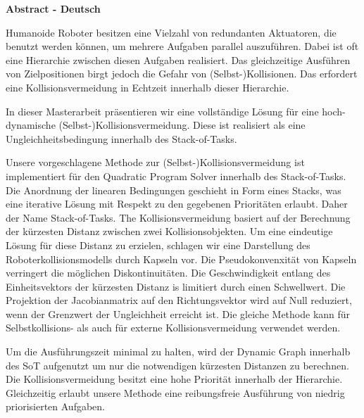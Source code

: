 

\clearemptydoublepage
{}
{}	

\vspace*{1cm}
\begin{center}
{\Large \bf Abstract - Deutsch}
\end{center}
\vspace{1cm}

Humanoide Roboter besitzen eine Vielzahl von redundanten Aktuatoren, die benutzt werden k{\"o}nnen, um mehrere Aufgaben parallel auszuf{\"u}hren. Dabei ist oft eine Hierarchie zwischen diesen Aufgaben realisiert. Das gleichzeitige Ausf{\"u}hren von Zielpositionen birgt jedoch die Gefahr von (Selbst-)Kollisionen. Das erfordert eine Kollisionsvermeidung in Echtzeit innerhalb dieser Hierarchie. 	

In dieser Masterarbeit pr{\"a}sentieren wir eine vollst{\"a}ndige L{\"o}sung f{\"u}r eine hoch-dynamische (Selbst-)Kollisionsvermeidung. Diese ist realisiert als eine Ungleichheitsbedingung innerhalb des Stack-of-Tasks.

Unsere vorgeschlagene Methode zur (Selbst-)Kollisionsvermeidung ist implementiert f{\"u}r den Quadratic Program Solver innerhalb des Stack-of-Tasks. Die Anordnung der linearen Bedingungen geschieht in Form eines Stacks, was eine iterative L{\"o}sung mit Respekt zu den gegebenen Priorit{\"a}ten erlaubt. Daher der Name Stack-of-Tasks. The Kollisionsvermeidung basiert auf der Berechnung der k{\"u}rzesten Distanz zwischen zwei Kollisionsobjekten. Um eine eindeutige L{\"o}sung f{\"u}r diese Distanz zu erzielen, schlagen wir eine Darstellung des Roboterkollisionsmodells durch Kapseln vor. Die Pseudokonvenxit{\"a}t von Kapseln verringert die m{\"o}glichen Diskontinuit{\"a}ten. Die Geschwindigkeit entlang des Einheitsvektors der k{\"u}rzesten Distanz is limitiert durch einen Schwellwert. Die Projektion der Jacobianmatrix auf den Richtungsvektor wird auf Null reduziert, wenn der Grenzwert der Ungleichheit erreicht ist. Die gleiche Methode kann f{\"u}r Selbstkollisions- als auch f{\"u}r externe Kollisionsvermeidung verwendet werden.

Um die Ausf{\"u}hrungszeit minimal zu halten, wird der Dynamic Graph innerhalb des SoT aufgenutzt um nur die notwendigen k{\"u}rzesten Distanzen zu berechnen. Die Kollisionsvermeidung besitzt eine hohe Priorit{\"a}t innerhalb der Hierarchie. Gleichzeitig erlaubt unsere Methode eine reibungsfreie Ausf{\"u}hrung von niedrig priorisierten Aufgaben.